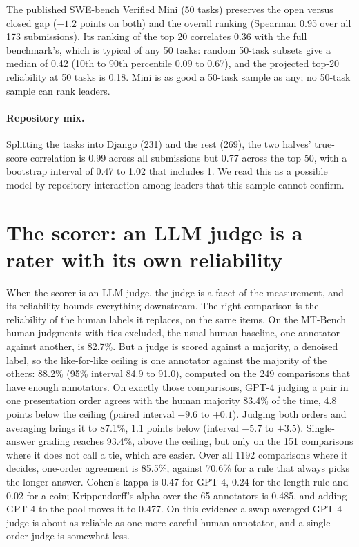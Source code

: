 \documentclass[11pt]{article}
\begin{document}
The published SWE-bench Verified Mini (50 tasks) preserves the open versus closed gap ($-1.2$ points on both) and the overall ranking (Spearman 0.95 over all 173 submissions). Its ranking of the top 20 correlates 0.36 with the full benchmark's, which is typical of any 50 tasks: random 50-task subsets give a median of 0.42 (10th to 90th percentile 0.09 to 0.67), and the projected top-20 reliability at 50 tasks is 0.18. Mini is as good a 50-task sample as any; no 50-task sample can rank leaders.

\paragraph{Repository mix.} Splitting the tasks into Django (231) and the rest (269), the two halves' true-score correlation is 0.99 across all submissions but 0.77 across the top 50, with a bootstrap interval of 0.47 to 1.02 that includes 1. We read this as a possible model by repository interaction among leaders that this sample cannot confirm.

\section{The scorer: an LLM judge is a rater with its own reliability}

When the scorer is an LLM judge, the judge is a facet of the measurement, and its reliability bounds everything downstream. The right comparison is the reliability of the human labels it replaces, on the same items. On the MT-Bench human judgments with ties excluded, the usual human baseline, one annotator against another, is 82.7\%. But a judge is scored against a majority, a denoised label, so the like-for-like ceiling is one annotator against the majority of the others: 88.2\% (95\% interval 84.9 to 91.0), computed on the 249 comparisons that have enough annotators. On exactly those comparisons, GPT-4 judging a pair in one presentation order agrees with the human majority 83.4\% of the time, 4.8 points below the ceiling (paired interval $-9.6$ to $+0.1$). Judging both orders and averaging brings it to 87.1\%, 1.1 points below (interval $-5.7$ to $+3.5$). Single-answer grading reaches 93.4\%, above the ceiling, but only on the 151 comparisons where it does not call a tie, which are easier. Over all 1192 comparisons where it decides, one-order agreement is 85.5\%, against 70.6\% for a rule that always picks the longer answer. Cohen's kappa \citep{cohen1960kappa} is 0.47 for GPT-4, 0.24 for the length rule and 0.02 for a coin; Krippendorff's alpha \citep{krippendorff2004reliability} over the 65 annotators is 0.485, and adding GPT-4 to the pool moves it to 0.477. On this evidence a swap-averaged GPT-4 judge is about as reliable as one more careful human annotator, and a single-order judge is somewhat less.
\end{document}
